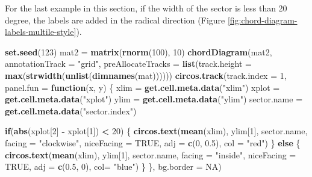 \documentclass[]{book}
\newenvironment{Shaded}{\begin{snugshade}}{\end{snugshade}}
\newcommand{\KeywordTok}[1]{\textcolor[rgb]{0.13,0.29,0.53}{\textbf{#1}}}
\newcommand{\DataTypeTok}[1]{\textcolor[rgb]{0.13,0.29,0.53}{#1}}
\newcommand{\DecValTok}[1]{\textcolor[rgb]{0.00,0.00,0.81}{#1}}
\newcommand{\FloatTok}[1]{\textcolor[rgb]{0.00,0.00,0.81}{#1}}
\newcommand{\StringTok}[1]{\textcolor[rgb]{0.31,0.60,0.02}{#1}}
\newcommand{\OtherTok}[1]{\textcolor[rgb]{0.56,0.35,0.01}{#1}}
\newcommand{\ControlFlowTok}[1]{\textcolor[rgb]{0.13,0.29,0.53}{\textbf{#1}}}
\newcommand{\OperatorTok}[1]{\textcolor[rgb]{0.81,0.36,0.00}{\textbf{#1}}}
\newcommand{\NormalTok}[1]{#1}
\begin{document}
For the last example in this section, if the width of the sector is less
than 20 degree, the labels are added in the radical direction (Figure
\ref{fig:chord-diagram-labels-multile-style}).

\begin{Shaded}
\begin{Highlighting}[]
\KeywordTok{set.seed}\NormalTok{(}\DecValTok{123}\NormalTok{)}
\NormalTok{mat2 =}\StringTok{ }\KeywordTok{matrix}\NormalTok{(}\KeywordTok{rnorm}\NormalTok{(}\DecValTok{100}\NormalTok{), }\DecValTok{10}\NormalTok{)}
\KeywordTok{chordDiagram}\NormalTok{(mat2, }\DataTypeTok{annotationTrack =} \StringTok{"grid"}\NormalTok{, }
    \DataTypeTok{preAllocateTracks =} \KeywordTok{list}\NormalTok{(}\DataTypeTok{track.height =} \KeywordTok{max}\NormalTok{(}\KeywordTok{strwidth}\NormalTok{(}\KeywordTok{unlist}\NormalTok{(}\KeywordTok{dimnames}\NormalTok{(mat))))))}
\KeywordTok{circos.track}\NormalTok{(}\DataTypeTok{track.index =} \DecValTok{1}\NormalTok{, }\DataTypeTok{panel.fun =} \ControlFlowTok{function}\NormalTok{(x, y) \{}
\NormalTok{    xlim =}\StringTok{ }\KeywordTok{get.cell.meta.data}\NormalTok{(}\StringTok{"xlim"}\NormalTok{)}
\NormalTok{    xplot =}\StringTok{ }\KeywordTok{get.cell.meta.data}\NormalTok{(}\StringTok{"xplot"}\NormalTok{)}
\NormalTok{    ylim =}\StringTok{ }\KeywordTok{get.cell.meta.data}\NormalTok{(}\StringTok{"ylim"}\NormalTok{)}
\NormalTok{    sector.name =}\StringTok{ }\KeywordTok{get.cell.meta.data}\NormalTok{(}\StringTok{"sector.index"}\NormalTok{)}

    \ControlFlowTok{if}\NormalTok{(}\KeywordTok{abs}\NormalTok{(xplot[}\DecValTok{2}\NormalTok{] }\OperatorTok{-}\StringTok{ }\NormalTok{xplot[}\DecValTok{1}\NormalTok{]) }\OperatorTok{<}\StringTok{ }\DecValTok{20}\NormalTok{) \{}
        \KeywordTok{circos.text}\NormalTok{(}\KeywordTok{mean}\NormalTok{(xlim), ylim[}\DecValTok{1}\NormalTok{], sector.name, }\DataTypeTok{facing =} \StringTok{"clockwise"}\NormalTok{,}
            \DataTypeTok{niceFacing =} \OtherTok{TRUE}\NormalTok{, }\DataTypeTok{adj =} \KeywordTok{c}\NormalTok{(}\DecValTok{0}\NormalTok{, }\FloatTok{0.5}\NormalTok{), }\DataTypeTok{col =} \StringTok{"red"}\NormalTok{)}
\NormalTok{    \} }\ControlFlowTok{else}\NormalTok{ \{}
        \KeywordTok{circos.text}\NormalTok{(}\KeywordTok{mean}\NormalTok{(xlim), ylim[}\DecValTok{1}\NormalTok{], sector.name, }\DataTypeTok{facing =} \StringTok{"inside"}\NormalTok{, }
            \DataTypeTok{niceFacing =} \OtherTok{TRUE}\NormalTok{, }\DataTypeTok{adj =} \KeywordTok{c}\NormalTok{(}\FloatTok{0.5}\NormalTok{, }\DecValTok{0}\NormalTok{), }\DataTypeTok{col=} \StringTok{"blue"}\NormalTok{)}
\NormalTok{    \}}
\NormalTok{\}, }\DataTypeTok{bg.border =} \OtherTok{NA}\NormalTok{)}
\end{Highlighting}
\end{Shaded}
\end{document}
